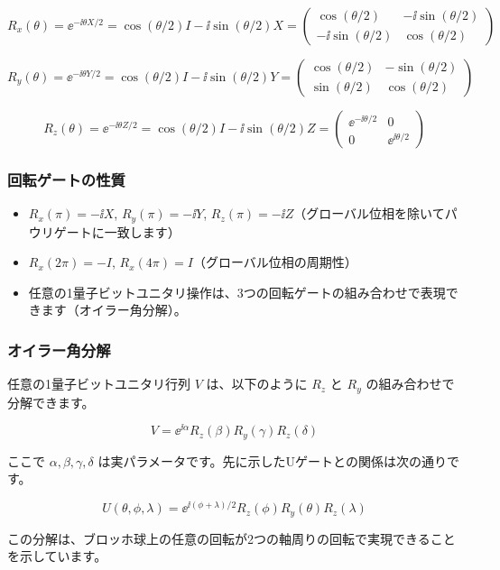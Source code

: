 \[
R_x(\theta) = \ee^{-\ii\theta X/2}
= \cos(\theta/2) I - \ii\sin(\theta/2) X
= \begin{pmatrix} \cos(\theta/2) & -\ii\sin(\theta/2) \\ -\ii\sin(\theta/2) & \cos(\theta/2) \end{pmatrix}
\]

\[
R_y(\theta) = \ee^{-\ii\theta Y/2}
= \cos(\theta/2) I - \ii\sin(\theta/2) Y
= \begin{pmatrix} \cos(\theta/2) & -\sin(\theta/2) \\ \sin(\theta/2) & \cos(\theta/2) \end{pmatrix}
\]

\[
R_z(\theta) = \ee^{-\ii\theta Z/2}
= \cos(\theta/2) I - \ii\sin(\theta/2) Z
= \begin{pmatrix} \ee^{-\ii\theta/2} & 0 \\ 0 & \ee^{\ii\theta/2} \end{pmatrix}
\]

\subsubsection{回転ゲートの性質}

\begin{itemize}
\item $R_x(\pi) = -\ii X$, $R_y(\pi) = -\ii Y$, $R_z(\pi) = -\ii Z$（グローバル位相を除いてパウリゲートに一致します）
\item $R_x(2\pi) = -I$, $R_x(4\pi) = I$（グローバル位相の周期性）
\item 任意の1量子ビットユニタリ操作は、3つの回転ゲートの組み合わせで表現できます（オイラー角分解）。
\end{itemize}

\subsubsection{オイラー角分解}

任意の1量子ビットユニタリ行列 $V$ は、以下のように $R_z$ と $R_y$ の組み合わせで分解できます。

\[
V = \ee^{\ii\alpha} R_z(\beta) R_y(\gamma) R_z(\delta)
\]

ここで $\alpha, \beta, \gamma, \delta$ は実パラメータです。先に示したUゲートとの関係は次の通りです。

\[
U(\theta,\phi,\lambda)
= \ee^{\ii(\phi+\lambda)/2}R_z(\phi)R_y(\theta)R_z(\lambda)
\]

この分解は、ブロッホ球上の任意の回転が2つの軸周りの回転で実現できることを示しています。

